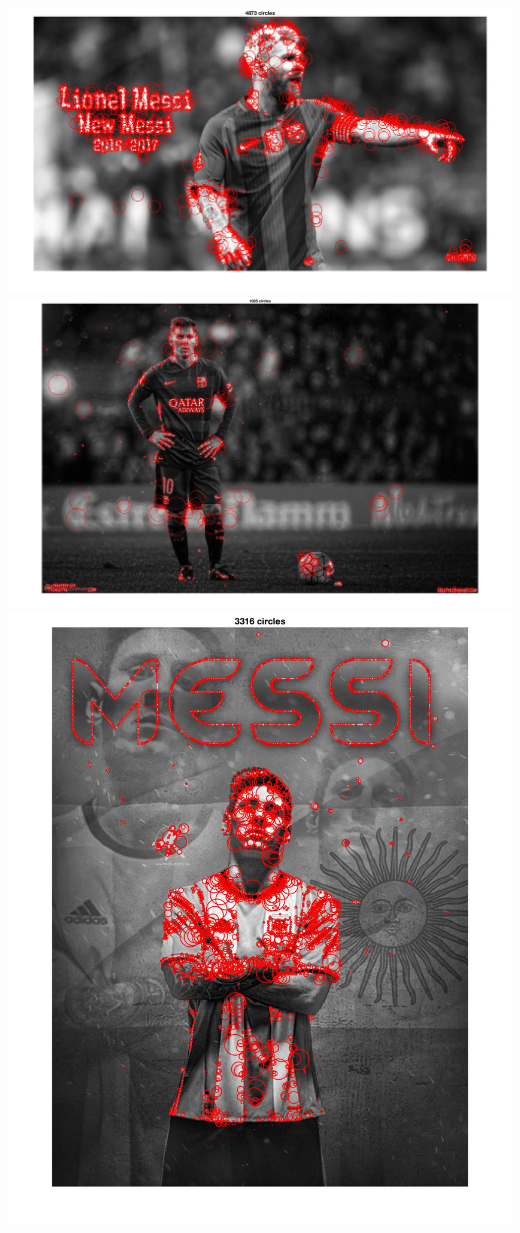 \documentclass[a4paper,11pt]{article}
\begin{document}
\includegraphics[width=\textwidth]{hw2/code/6}\\
\includegraphics[width=\textwidth]{hw2/code/7}\\
\includegraphics[width=\textwidth]{hw2/code/8}\\
\vfill
\end{document}
